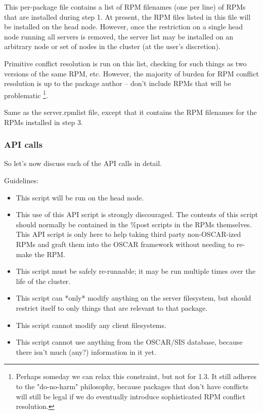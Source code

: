 This per-package file contains a list of RPM filenames (one per line) of
RPMs that are installed during step 1.  At present, the RPM files
listed in this file will be installed on the head node.  However, once
the restriction on a single head node running all servers is removed,
the server list may be installed on an arbitrary node or set of nodes
in the cluster (at the user's discretion).

Primitive conflict resolution is run on this list, checking for such
things as two versions of the same RPM, etc.  However, the majority of
burden for RPM conflict resolution is up to the package author --
don't include RPMs that will be problematic \footnote{ Perhaps
someday we can relax this constraint, but not for 1.3.  It still
adheres to the "do-no-harm" philosophy, because packages that don't
have conflicts will still be legal if we do eventually introduce
sophisticated RPM conflict resolution.}.


Same as the server.rpmlist file, except that it contains the RPM
filenames for the RPMs installed in step 3.


\subsubsection{API calls}

So let's now discuss each of the API calls in detail.


Guidelines:

\begin{itemize}
\item This script will be run on the head node.
\item This use of this API script is strongly discouraged.  The contents
  of this script should normally be contained in the \%post scripts in
  the RPMs themselves.  This API script is only here to help taking
  third party non-OSCAR-ized RPMs and graft them into the OSCAR
  framework without needing to re-make the RPM.
\item This script must be safely re-runnable; it may be run multiple times
  over the life of the cluster.
\item This script can *only* modify anything on the server filesystem, but
  should restrict itself to only things that are relevant to that
  package.
\item This script cannot modify any client filesystems.
\item This script cannot use anything from the OSCAR/SIS database,
  because there isn't much (any?) information in it yet.
\end{itemize}


